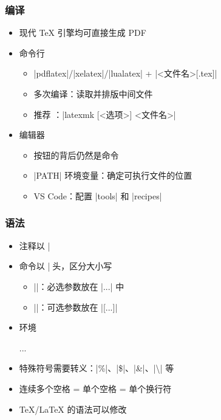 \begin{frame}[fragile]
\frametitle{编译}
\begin{itemize}
  \item 现代 \TeX{} 引擎均可直接生成 PDF \pause
  \item 命令行

    \begin{itemize}
      \item |pdflatex|/|xelatex|/|lualatex| + |<文件名>[.tex]|
      \item 多次编译：读取并排版中间文件 \pause
      \item 推荐 ：|latexmk [<选项>] <文件名>|
    \end{itemize} \pause

  \item 编辑器

    \begin{itemize}
      \item 按钮的背后仍然是命令
      \item |PATH| 环境变量：确定可执行文件的位置
      \item VS Code：配置 |tools| 和 |recipes|
    \end{itemize}
\end{itemize}
\end{frame}

\begin{frame}[fragile]
\frametitle{语法}
\begin{itemize}
  \item 注释以 |%
  \item 命令以 |\| 开头，区分大小写

    \begin{itemize}
      \item ||：必选参数放在 |{...}| 中
      \item ||：可选参数放在 |[...]|
    \end{itemize}

  \item 环境

    \begin{texcode}[gobble=4, emph={[1]env}]
      \begin{env}
        ...
      \end{env}
    \end{texcode}

  \item 特殊符号需要转义：|\%|、|\$|、|\&|、|\textbackslash| 等
  \item 连续多个空格 = 单个空格 = 单个换行符 \pause
  \item \TeX{}/\LaTeX{} 的语法可以修改
\end{itemize}
\end{frame}


